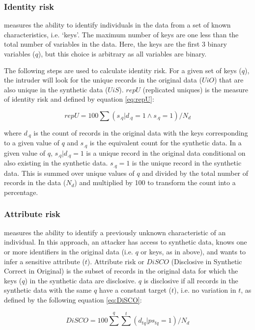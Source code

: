 \documentclass[runningheads]{llncs}
\begin{document}
\subsubsection{Identity risk} measures the ability to identify individuals in the data from a set of known characteristics, i.e. `keys'. The maximum number of keys are one less than the total number of variables in the data.  Here, the keys are the first 3 binary variables ($q$), but this choice is arbitrary as all variables are binary.  

The following steps are used to calculate identity risk.  For a given set of keys ($q$), the intruder will look for the unique records in the original data ($UiO$) that are also unique in the synthetic data ($UiS$).  $repU$ (replicated uniques) is the measure of identity risk and defined by equation \ref{eq:repU}:

\begin{equation}
repU = 100 \sum (s_{.q}|d_{.q} = 1 \land s_{.q} = 1 )/N_{d}
\label{eq:repU}
\end{equation}

where $d_{.q}$ is the count of records in the original data with the keys corresponding to a given value of $q$ and $s_{.q}$ is the equivalent count for the synthetic data.  In a given value of $q$, $s_{.q}|d_{.q} = 1$ is a unique record in the original data conditional on also existing in the synthetic data.  $s_{.q} = 1$ is the unique record in the synthetic data.  This is summed over unique values of $q$ and divided by the total number of records in the data ($N_{d}$) and multiplied by 100 to transform the count into a percentage.

\subsubsection{Attribute risk} measures the ability to identify a previously unknown characteristic of an individual.  In this approach, an attacker has access to synthetic data, knows one or more identifiers in the original data (i.e. $q$ or keys, as in above), and wants to infer a sensitive attribute ($t$).  Attribute risk or $DiSCO$ (Disclosive in Synthetic Correct in Original) is the subset of records in the original data for which the keys ($q$) in the synthetic data are disclosive. $q$ is disclosive if all records in the synthetic data with the same $q$ have a constant target ($t$), i.e. no variation in $t$, as defined by the following equation \ref{eq:DiSCO}:

\begin{equation}
DiSCO = 100 \sum^{q} \sum^{t} (d_{tq} | ps_{tq} = 1) / N_{d}
\label{eq:DiSCO}
\end{equation}
\end{document}
